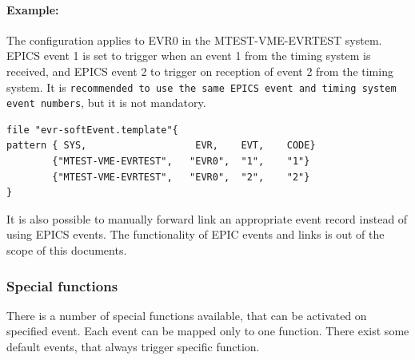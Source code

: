 \documentclass[12pt,a4paper]{article}
\begin{document}
\paragraph{Example:} The configuration applies to EVR0 in the MTEST-VME-EVRTEST system. EPICS event 1 is set to trigger when an event 1 from the timing system is received, and EPICS event 2 to trigger on reception of event 2 from the timing system. It is \texttt{recommended to use the same EPICS event and timing system event numbers}, but it is not mandatory.

\begin{verbatim}
file "evr-softEvent.template"{
pattern { SYS,                   EVR,    EVT,    CODE}
        {"MTEST-VME-EVRTEST",   "EVR0",  "1",    "1"}
        {"MTEST-VME-EVRTEST",   "EVR0",  "2",    "2"}
}
\end{verbatim}

It is also possible to manually forward link an appropriate event record instead of using EPICS events. The functionality of EPIC events and links is out of the scope of this documents.

\subsubsection{Special functions}\label{sec:Special functions}
There is a number of special functions available, that can be activated
on specified event. Each event can be mapped only to one function. There
exist some default events, that always trigger specific function.
\end{document}
